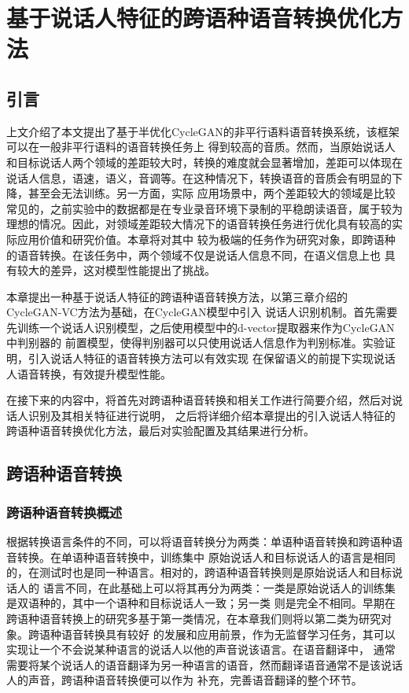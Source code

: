 \chapter{基于说话人特征的跨语种语音转换优化方法}

\section{引言}

上文介绍了本文提出了基于半优化CycleGAN的非平行语料语音转换系统，该框架可以在一般非平行语料的语音转换任务上
得到较高的音质。然而，当原始说话人和目标说话人两个领域的差距较大时，转换的难度就会显著增加，差距可以体现在
说话人信息，语速，语义，音调等。在这种情况下，转换语音的音质会有明显的下降，甚至会无法训练。另一方面，实际
应用场景中，两个差距较大的领域是比较常见的，之前实验中的数据都是在专业录音环境下录制的平稳朗读语音，属于较为
理想的情况。因此，对领域差距较大情况下的语音转换任务进行优化具有较高的实际应用价值和研究价值。本章将对其中
较为极端的任务作为研究对象，即跨语种的语音转换。在该任务中，两个领域不仅是说话人信息不同，在语义信息上也
具有较大的差异，这对模型性能提出了挑战。

本章提出一种基于说话人特征的跨语种语音转换方法，以第三章介绍的CycleGAN-VC方法为基础，在CycleGAN模型中引入
说话人识别机制。首先需要先训练一个说话人识别模型，之后使用模型中的d-vector提取器来作为CycleGAN中判别器的
前置模型，使得判别器可以只使用说话人信息作为判别标准。实验证明，引入说话人特征的语音转换方法可以有效实现
在保留语义的前提下实现说话人语音转换，有效提升模型性能。

在接下来的内容中，将首先对跨语种语音转换和相关工作进行简要介绍，然后对说话人识别及其相关特征进行说明，
之后将详细介绍本章提出的引入说话人特征的跨语种语音转换优化方法，最后对实验配置及其结果进行分析。

\section{跨语种语音转换}
\subsection{跨语种语音转换概述}
根据转换语言条件的不同，可以将语音转换分为两类：单语种语音转换和跨语种语音转换。在单语种语音转换中，训练集中
原始说话人和目标说话人的语言是相同的，在测试时也是同一种语言。相对的，跨语种语音转换则是原始说话人和目标说话人的
语言不同，在此基础上可以将其再分为两类：一类是原始说话人的训练集是双语种的，其中一个语种和目标说话人一致；另一类
则是完全不相同。早期在跨语种语音转换上的研究多基于第一类情况，在本章我们则将以第二类为研究对象。跨语种语音转换具有较好
的发展和应用前景，作为无监督学习任务，其可以实现让一个不会说某种语言的说话人以他的声音说该语言。在语音翻译中，
通常需要将某个说话人的语音翻译为另一种语言的语音，然而翻译语音通常不是该说话人的声音，跨语种语音转换便可以作为
补充，完善语音翻译的整个环节。

